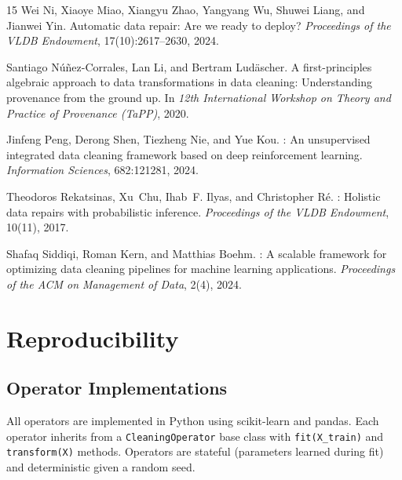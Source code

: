 \documentclass[preprint]{article}
\begin{document}
\begin{thebibliography}{15}
Wei Ni, Xiaoye Miao, Xiangyu Zhao, Yangyang Wu, Shuwei Liang, and Jianwei Yin.
\newblock Automatic data repair: Are we ready to deploy?
\newblock \emph{Proceedings of the VLDB Endowment}, 17(10):2617--2630, 2024.

Santiago N{\'u}{\~n}ez-Corrales, Lan Li, and Bertram Lud{\"a}scher.
\newblock A first-principles algebraic approach to data transformations in data
  cleaning: Understanding provenance from the ground up.
\newblock In \emph{12th International Workshop on Theory and Practice of
  Provenance (TaPP)}, 2020.

Jinfeng Peng, Derong Shen, Tiezheng Nie, and Yue Kou.
: An unsupervised integrated data cleaning framework based
  on deep reinforcement learning.
\newblock \emph{Information Sciences}, 682:121281, 2024.

Theodoros Rekatsinas, Xu~Chu, Ihab~F. Ilyas, and Christopher R{\'e}.
: Holistic data repairs with probabilistic inference.
\newblock \emph{Proceedings of the VLDB Endowment}, 10(11), 2017.

Shafaq Siddiqi, Roman Kern, and Matthias Boehm.
: A scalable framework for optimizing data cleaning pipelines
  for machine learning applications.
\newblock \emph{Proceedings of the ACM on Management of Data}, 2(4), 2024.

\end{thebibliography}

\newpage
\appendix

\section{Reproducibility}
\label{app:reproducibility}

\subsection{Operator Implementations}

All operators are implemented in Python using scikit-learn and pandas. Each operator inherits from a \texttt{CleaningOperator} base class with \texttt{fit(X\_train)} and \texttt{transform(X)} methods. Operators are stateful (parameters learned during fit) and deterministic given a random seed.
\end{document}
